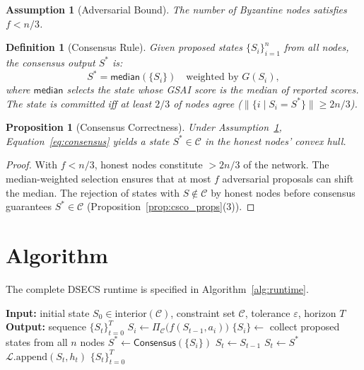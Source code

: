 \documentclass[11pt,letterpaper]{article}
\newtheorem{definition}[theorem]{Definition}
\newtheorem{assumption}[theorem]{Assumption}
\newtheorem{proposition}[theorem]{Proposition}
\newcommand{\cC}{\mathcal{C}}
\newcommand{\cL}{\mathcal{L}}
\begin{document}
\begin{assumption}[Adversarial Bound]
\label{ass:byzantine}
The number of Byzantine nodes satisfies $f < n/3$.
\end{assumption}

\begin{definition}[Consensus Rule]
Given proposed states $\{S_i\}_{i=1}^n$ from all nodes, the consensus
output $S^*$ is:
\begin{equation}
    S^* = \textsf{median}\left(\{S_i\}\right)
    \quad\text{weighted by } G(S_i),
    \label{eq:consensus}
\end{equation}
where $\textsf{median}$ selects the state whose GSAI score is the
median of reported scores.
The state is committed iff at least $2/3$ of nodes agree
($\| \{i \mid S_i = S^*\}\| \geq 2n/3$).
\end{definition}

\begin{proposition}[Consensus Correctness]
\label{prop:consensus}
Under Assumption~\ref{ass:byzantine}, Equation~\eqref{eq:consensus}
yields a state $S^* \in \cC$ in the honest nodes' convex hull.
\end{proposition}
\begin{proof}
With $f < n/3$, honest nodes constitute $> 2n/3$ of the network.
The median-weighted selection ensures that at most $f$ adversarial
proposals can shift the median. The rejection of states with $S \notin
\cC$ by honest nodes before consensus guarantees $S^* \in \cC$
(Proposition~\ref{prop:csco_props}(3)).
\end{proof}

\section{Algorithm}

The complete DSECS runtime is specified in Algorithm~\ref{alg:runtime}.

\begin{algorithm}[t]
\caption{DSECS Runtime}
\label{alg:runtime}
\begin{algorithmic}
\STATE \textbf{Input:} initial state $S_0 \in \text{interior}(\cC)$,
constraint set $\cC$, tolerance $\varepsilon$, horizon $T$
\STATE \textbf{Output:} sequence $\{S_t\}_{t=0}^T$
        \STATE $S_i \gets \Pi_{\cC}\bigl(f(S_{t-1}, a_i)\bigr)$
    \ENDFOR
    \STATE $\{S_i\} \gets$ collect proposed states from all $n$ nodes
    \STATE $S^* \gets \textsf{Consensus}(\{S_i\})$ 
        \STATE $S_t \gets S_{t-1}$ 
    \ELSE
        \STATE $S_t \gets S^*$ 
    \ENDIF
    \STATE $\cL.\text{append}(S_t, h_t)$ 
\ENDFOR
\RETURN $\{S_t\}_{t=0}^T$
\end{algorithmic}
\end{algorithm}
\end{document}
